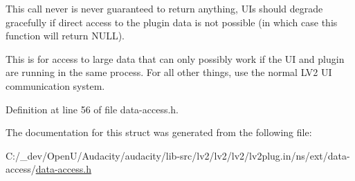 This call never is never guaranteed to return anything, U\+Is should degrade gracefully if direct access to the plugin data is not possible (in which case this function will return N\+U\+LL).

This is for access to large data that can only possibly work if the UI and plugin are running in the same process. For all other things, use the normal L\+V2 UI communication system. 

Definition at line 56 of file data-\/access.\+h.



The documentation for this struct was generated from the following file\+:\begin{DoxyCompactItemize}
\item 
C\+:/\+\_\+dev/\+Open\+U/\+Audacity/audacity/lib-\/src/lv2/lv2/lv2/lv2plug.\+in/ns/ext/data-\/access/\hyperlink{data-access_8h}{data-\/access.\+h}\end{DoxyCompactItemize}
